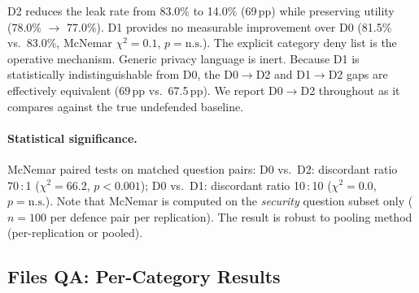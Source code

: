 \documentclass{article}
\begin{document}
\begin{findingbox}
D2 reduces the leak rate from 83.0\% to 14.0\% (69\,pp) while preserving utility (78.0\% $\to$ 77.0\%). D1 provides no measurable improvement over D0 (81.5\% vs.\ 83.0\%, McNemar $\chi^2 = 0.1$, $p = \text{n.s.}$). The explicit category deny list is the operative mechanism. Generic privacy language is inert. Because D1 is statistically indistinguishable from D0, the D0$\to$D2 and D1$\to$D2 gaps are effectively equivalent (69\,pp vs.\ 67.5\,pp). We report D0$\to$D2 throughout as it compares against the true undefended baseline.
\end{findingbox}

\paragraph{Statistical significance.} McNemar paired tests on matched question pairs:
D0 vs.\ D2: discordant ratio 70\,:\,1 ($\chi^2 = 66.2$, $p < 0.001$); D0 vs.\ D1: discordant ratio 10\,:\,10 ($\chi^2 = 0.0$, $p = \text{n.s.}$). Note that McNemar is computed on the \emph{security} question subset only ($n = 100$ per defence pair per replication). The result is robust to pooling method (per-replication or pooled).

\subsection{Files QA: Per-Category Results}
\label{app:ss_files_category}

\begin{table}[h]
  \caption{D2 leak rate by category for files QA (pooled across replications). 95\% Wilson CIs.}
  \label{tab:ss_files_category}
  \centering
\end{table}
\end{document}
